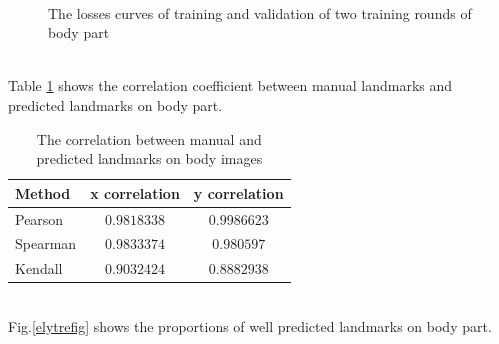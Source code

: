 \documentclass[12pt,a4paper]{article}
\begin{document}
\begin{figure}[h!]
\centering
{}~~
\caption{The losses curves of training and validation of two training rounds of body part}
\label{losselytrecurves}
\end{figure}~\\[3cm]
Table \ref{corrbody} shows the correlation coefficient between manual landmarks and predicted landmarks on body part.
\begin{table}[h!]
	\centering
	\begin{tabular}{l c c}
		Method & x correlation & y correlation \\ \hline
		Pearson & $0.9818338$ & $0.9986623$ \\ \hline
		Spearman & $0.9833374$ & $0.980597$ \\ \hline
		Kendall & $0.9032424$ & $0.8882938$ \\ \hline
	\end{tabular}
	\caption{The correlation between manual and predicted landmarks on body images}
	\label{corrbody}
\end{table}~\\
Fig.\ref{elytrefig} shows the proportions of well predicted landmarks on body part.
\end{document}
